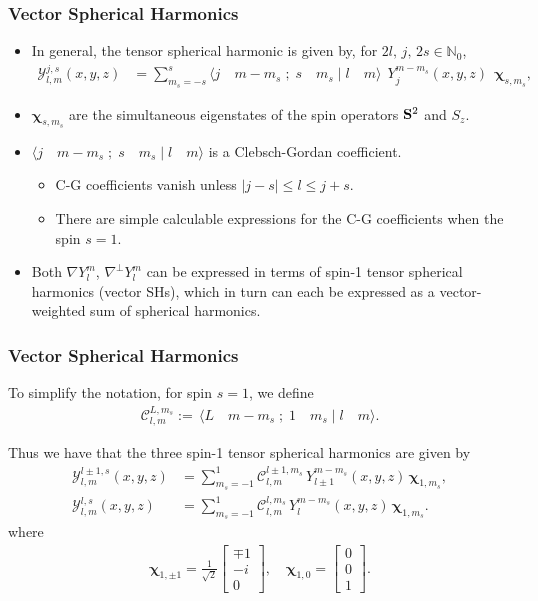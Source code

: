 \documentclass[10pt]{beamer}
\newcommand{\No}{\mathbb{N}_0}
\newcommand{\gradYlm}{\nabla Y^m_l}
\newcommand{\gradpYlm}{\nabla^\perp Y^m_l}
\newcommand{\curlyy}{\bm{\mathcal{Y}}}
\newcommand{\chivec}{\bm{\chi}_{1,m_s}}
\newcommand{\cgcoeff}{\mathcal{C}}
\begin{document}
\frame
{
    \frametitle{Vector Spherical Harmonics}
    
\begin{itemize}

\item In general, the tensor spherical harmonic is given by, for \(2l, \, j, \, 2s \in \No\),
\begin{align}
\curlyy^{j,s}_{l,m}(x,y,z) &= \sum_{m_s=-s}^s \langle j \quad m-m_s \; ; \; s \quad m_s \; | \; l \quad m \rangle \: \: Y^{m-m_s}_j (x,y,z) \: \: \bm{\chi}_{s, m_s},
\end{align}

\item \(\bm{\chi}_{s, m_s}\) are the simultaneous eigenstates of the spin operators \(\bold{S}^2\) and \(S_z\).
    
\item \(\langle j \quad m-m_s \; ; \; s \quad m_s \; | \; l \quad m \rangle\) is a Clebsch-Gordan coefficient. 
\begin{itemize}
	\item C-G coefficients vanish unless \(|j - s| \le l \le j + s\). 
	\item There are simple calculable expressions for the C-G coefficients when the spin \(s=1\).
\end{itemize}

\item Both \(\gradYlm\), \(\gradpYlm\) can be expressed in terms of spin-1 tensor spherical harmonics (vector SHs), which in turn can each be expressed as a vector-weighted sum of spherical harmonics.

\end{itemize}

}

\frame
{
    \frametitle{Vector Spherical Harmonics}

To simplify the notation, for spin $s=1$, we define
\begin{align}
\cgcoeff^{L, m_s}_{l, m} := \, \langle L \quad m-m_s \; ; \; 1 \quad m_s \; | \; l \quad m \rangle.
\end{align}

Thus we have that the three spin-1 tensor spherical harmonics are given by
\begin{align}
\curlyy^{l \pm1,s}_{l,m}(x,y,z) &= \sum_{m_s=-1}^1 \cgcoeff^{l\pm1, m_s}_{l, m} \, Y^{m-m_s}_{l \pm 1} (x,y,z) \, \chivec, \\
\curlyy^{l,s}_{l,m}(x,y,z) &= \sum_{m_s=-1}^1 \cgcoeff^{l, m_s}_{l, m} \, Y^{m-m_s}_l (x,y,z) \, \chivec.
\end{align}
where
\begin{align}
\bm{\chi}_{1, \pm 1} = \frac{1}{\sqrt{2}} \begin{bmatrix} \mp 1 \\ -i \\ 0 \end{bmatrix}, \quad \bm{\chi}_{1,0} = \begin{bmatrix} 0 \\ 0 \\ 1 \end{bmatrix}.
\end{align}

}
\end{document}
